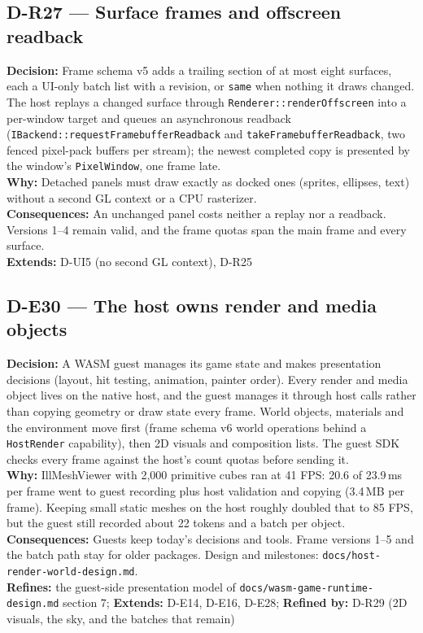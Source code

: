 \subsection*{D-R27 --- Surface frames and offscreen readback}
\begin{decisionbox}[title={D-R27 \quad 2026-09-23}]
\textbf{Decision:} Frame schema v5 adds a trailing section of at most eight
surfaces, each a UI-only batch list with a revision, or \texttt{same} when
nothing it draws changed. The host replays a changed surface through
\texttt{Renderer::renderOffscreen} into a per-window target and queues an
asynchronous readback (\texttt{IBackend::requestFramebufferReadback} and
\texttt{takeFramebufferReadback}, two fenced pixel-pack buffers per stream);
the newest completed copy is presented by the window's \texttt{PixelWindow},
one frame late.\\
\textbf{Why:} Detached panels must draw exactly as docked ones (sprites,
ellipses, text) without a second GL context or a CPU rasterizer.\\
\textbf{Consequences:} An unchanged panel costs neither a replay nor a
readback. Versions 1--4 remain valid, and the frame quotas span the main frame
and every surface.\\
\textbf{Extends:} D-UI5 (no second GL context), D-R25
\end{decisionbox}

\subsection*{D-E30 --- The host owns render and media objects}
\begin{decisionbox}[title={D-E30 \quad 2026-09-26}]
\textbf{Decision:} A WASM guest manages its game state and makes presentation
decisions (layout, hit testing, animation, painter order). Every render and
media object lives on the native host, and the guest manages it through host
calls rather than copying geometry or draw state every frame. World objects,
materials and the environment move first (frame schema v6 world operations
behind a \texttt{HostRender} capability), then 2D visuals and composition
lists. The guest SDK checks every frame against the host's count quotas
before sending it.\\
\textbf{Why:} IllMeshViewer with 2,000 primitive cubes ran at 41 FPS: 20.6 of
23.9\,ms per frame went to guest recording plus host validation and copying
(3.4\,MB per frame). Keeping small static meshes on the host roughly doubled
that to 85 FPS, but the guest still recorded about 22 tokens and a batch per
object.\\
\textbf{Consequences:} Guests keep today's decisions and tools. Frame versions
1--5 and the batch path stay for older packages. Design and milestones:
\texttt{docs/host-render-world-design.md}.\\
\textbf{Refines:} the guest-side presentation model of
\texttt{docs/wasm-game-runtime-design.md} section 7; \textbf{Extends:} D-E14,
D-E16, D-E28; \textbf{Refined by:} D-R29 (2D visuals, the sky, and the
batches that remain)
\end{decisionbox}

